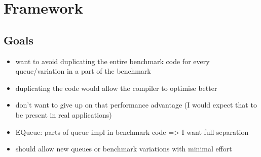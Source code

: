 \section{Framework}
\subsection{Goals}
\begin{itemize}
    \item want to avoid duplicating the entire benchmark code for every queue/variation in a part of the benchmark
    \item duplicating the code would allow the compiler to optimise better
    \item don't want to give up on that performance advantage (I would expect that to be present in real applications)
    \item EQueue: parts of queue impl in benchmark code => I want full separation
    \item should allow new queues or benchmark variations with minimal effort
\end{itemize}

